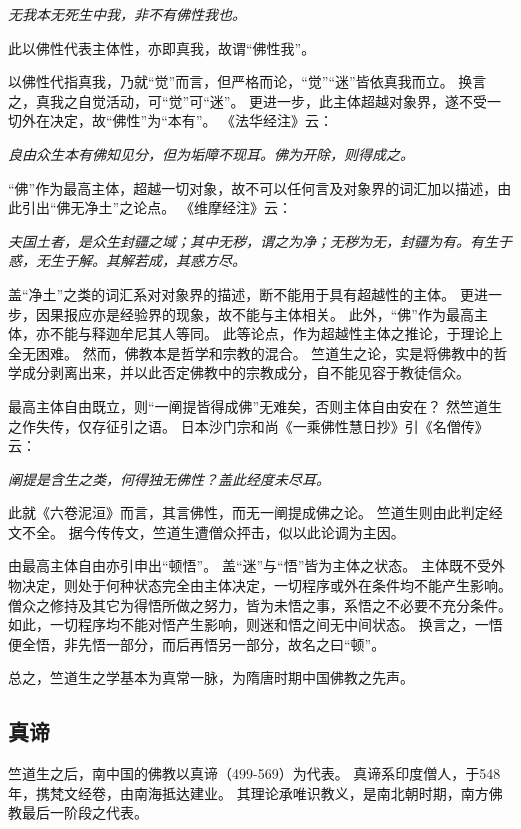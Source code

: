 \documentclass[11pt]{article}
\begin{document}
\textit{无我本无死生中我，非不有佛性我也。}

此以佛性代表主体性，亦即真我，故谓“佛性我”。

\par

以佛性代指真我，乃就“觉”而言，但严格而论，“觉”“迷”皆依真我而立。
换言之，真我之自觉活动，可“觉”可“迷”。
更进一步，此主体超越对象界，遂不受一切外在决定，故“佛性”为“本有”。
《法华经注》云：

\textit{良由众生本有佛知见分，但为垢障不现耳。佛为开除，则得成之。}

\par

“佛”作为最高主体，超越一切对象，故不可以任何言及对象界的词汇加以描述，由此引出“佛无净土”之论点。
《维摩经注》云：

\textit{夫国土者，是众生封疆之域；其中无秽，谓之为净；无秽为无，封疆为有。有生于惑，无生于解。其解若成，其惑方尽。}

盖“净土”之类的词汇系对对象界的描述，断不能用于具有超越性的主体。
更进一步，因果报应亦是经验界的现象，故不能与主体相关。
此外，“佛”作为最高主体，亦不能与释迦牟尼其人等同。
此等论点，作为超越性主体之推论，于理论上全无困难。
然而，佛教本是哲学和宗教的混合。
竺道生之论，实是将佛教中的哲学成分剥离出来，并以此否定佛教中的宗教成分，自不能见容于教徒信众。

\par

最高主体自由既立，则“一阐提皆得成佛”无难矣，否则主体自由安在？
然竺道生之作失传，仅存征引之语。
日本沙门宗和尚《一乘佛性慧日抄》引《名僧传》云：

\textit{阐提是含生之类，何得独无佛性？盖此经度未尽耳。}

此就《六卷泥洹》而言，其言佛性，而无一阐提成佛之论。
竺道生则由此判定经文不全。
据今传传文，竺道生遭僧众抨击，似以此论调为主因。

\par

由最高主体自由亦引申出“顿悟”。
盖“迷”与“悟”皆为主体之状态。
主体既不受外物决定，则处于何种状态完全由主体决定，一切程序或外在条件均不能产生影响。
僧众之修持及其它为得悟所做之努力，皆为未悟之事，系悟之不必要不充分条件。
如此，一切程序均不能对悟产生影响，则迷和悟之间无中间状态。
换言之，一悟便全悟，非先悟一部分，而后再悟另一部分，故名之曰“顿”。

\par

总之，竺道生之学基本为真常一脉，为隋唐时期中国佛教之先声。

\subsection{真谛}
竺道生之后，南中国的佛教以真谛（499-569）为代表。
真谛系印度僧人，于548年，携梵文经卷，由南海抵达建业。
其理论承唯识教义，是南北朝时期，南方佛教最后一阶段之代表。
\end{document}
